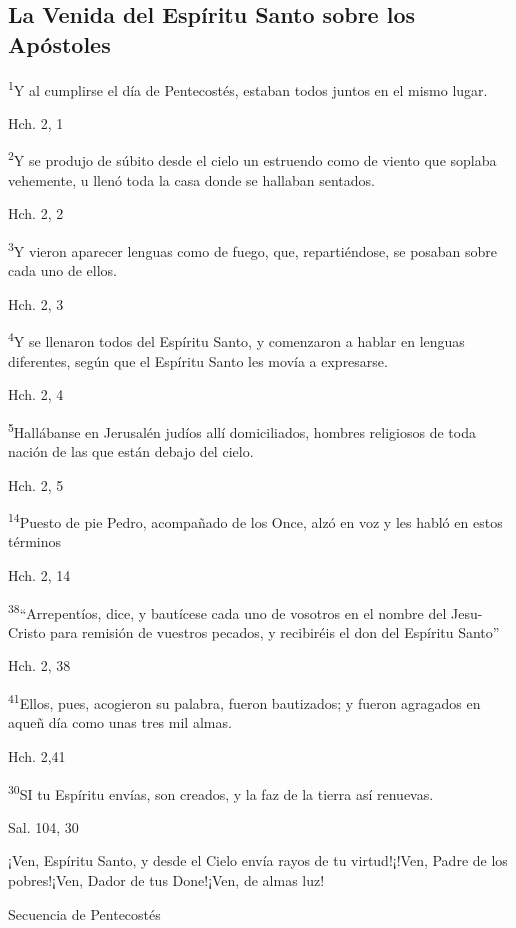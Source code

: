 \documentclass[a4paper,11pt]{article}
\begin{document}
    \subsection*{\hfil La Venida del Espíritu Santo sobre los Apóstoles \hfil}
      \textsuperscript{1}Y al cumplirse el día de Pentecostés, estaban todos juntos en el mismo lugar.
      \begin{flushright}
        Hch. 2, 1
      \end{flushright}      
      \textsuperscript{2}Y se produjo de súbito desde el cielo un estruendo como de viento que soplaba vehemente, u llenó toda la casa
      donde se hallaban sentados.
      \begin{flushright}
        Hch. 2, 2
      \end{flushright}      
      \textsuperscript{3}Y vieron aparecer lenguas como de fuego, que, repartiéndose, se posaban sobre cada uno de ellos.
      \begin{flushright}
        Hch. 2, 3
      \end{flushright}      
      \textsuperscript{4}Y se llenaron todos del Espíritu Santo, y comenzaron a hablar en lenguas diferentes, según que el Espíritu Santo les movía
      a expresarse.
      \begin{flushright}
        Hch. 2, 4
      \end{flushright}      
      \textsuperscript{5}Hallábanse en Jerusalén judíos allí domiciliados, hombres religiosos de toda nación de las que están debajo del cielo.
      \begin{flushright}
        Hch. 2, 5
      \end{flushright}      
      \textsuperscript{14}Puesto de pie Pedro, acompañado de los Once, alzó en voz y les habló en estos términos
      \begin{flushright}
        Hch. 2, 14
      \end{flushright}      
      \textsuperscript{38}``Arrepentíos, dice, y bautícese cada uno de vosotros en el nombre del Jesu-Cristo para remisión de vuestros pecados, y recibiréis el don
      del Espíritu Santo''
      \begin{flushright}
        Hch. 2, 38
      \end{flushright}      
      \textsuperscript{41}Ellos, pues, acogieron su palabra, fueron bautizados; y fueron agragados en aqueñ día como unas tres mil almas.
      \begin{flushright}
        Hch. 2,41
      \end{flushright}      
      \textsuperscript{30}SI tu Espíritu envías, son creados, y la faz de la tierra así renuevas.
      \begin{flushright}
        Sal. 104, 30
      \end{flushright}      
      ¡Ven, Espíritu Santo, y desde el Cielo envía rayos de tu virtud!¡!Ven, Padre de los pobres!¡Ven, Dador de tus Done!¡Ven, de almas luz!
      \begin{flushright}
        Secuencia de Pentecostés
      \end{flushright}
\end{document}
